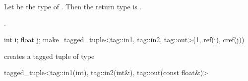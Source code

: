 \begin{addedblock}
\begin{itemdescr}
\pnum
Let  be the type of .
Then the return type is .

\pnum
\returns {}.

\pnum
\enterexample

\begin{codeblock}
int i; float j;
make_tagged_tuple<tag::in1, tag::in2, tag::out>(1, ref(i), cref(j))
\end{codeblock}

creates a tagged tuple of type

\begin{codeblock}
tagged_tuple<tag::in1(int), tag::in2(int&), tag::out(const float&)>
\end{codeblock}
\exitexample
\end{itemdescr}
\end{addedblock}
